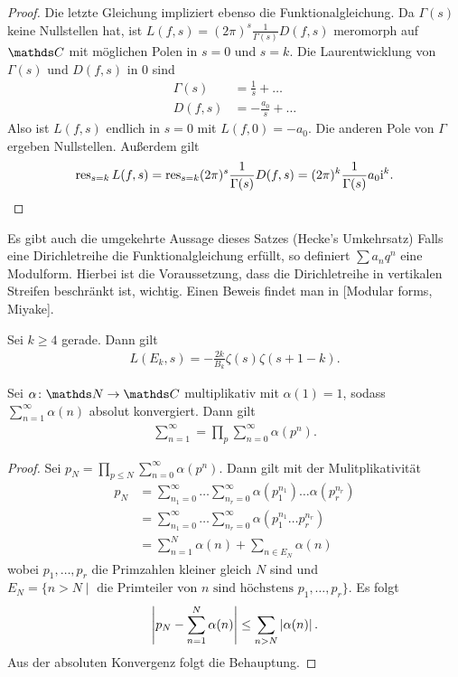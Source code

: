 \begin{proof}
Die letzte Gleichung impliziert ebenso die Funktionalgleichung.
Da $\Gamma(s)$ keine Nullstellen hat, ist $L(f,s)=(2\pi)^s \frac{1}{\Gamma(s)}D(f,s)$ meromorph auf $\C$ mit möglichen Polen in $s=0$ und $s=k$.
Die Laurentwicklung von $\Gamma(s)$ und $D(f,s)$ in $0$ sind
\begin{align*}
\Gamma(s)&=\frac{1}{s}+\dots\\
D(f,s)&=-\frac{a_0}{s}+\dots
\end{align*}
Also ist $L(f,s)$ endlich in $s=0$ mit $L(f,0)=-a_0$.
Die anderen Pole von $\Gamma$ ergeben Nullstellen.
Außerdem gilt
\begin{align*}
\operatorname{res}_{s=k}L(f,s)=\operatorname{res}_{s=k} (2\pi)^s \frac{1}{\Gamma(s)} D(f,s)=(2\pi)^k \frac{1}{\Gamma(s)}a_0\mathrm{i}^k. \qedhere
\end{align*}
\end{proof}
Es gibt auch die umgekehrte Aussage dieses Satzes (Hecke's Umkehrsatz)
Falls eine Dirichletreihe die Funktionalgleichung erfüllt, so definiert $\sum a_n q^n$ eine Modulform.
Hierbei ist die Voraussetzung, dass die Dirichletreihe in vertikalen Streifen beschränkt ist, wichtig.
Einen Beweis findet man in [Modular forms, Miyake].

\begin{bsp}
Sei $k\geq 4$ gerade. Dann gilt
\begin{align*}
L(E_k,s)=-\frac{2k}{B_k} \zeta(s)\zeta(s+1-k).
\end{align*}
\end{bsp}

\begin{prop}
Sei $\alpha \colon \N \to \C$ multiplikativ mit $\alpha(1)=1$, sodass
$\sum_{n=1}^\infty \alpha(n)$ absolut konvergiert.
Dann gilt
\begin{align*}
\sum_{n=1}^\infty=\prod_p \sum_{n=0}^\infty \alpha(p^n).
\end{align*}
\end{prop}
\begin{proof}
Sei $p_N=\prod_{p\leq N} \sum_{n=0}^\infty \alpha(p^n)$.
Dann gilt mit der Mulitplikativität
\begin{align*}
 p_N&=\sum_{n_1=0}^\infty \dots \sum_{n_r=0}^\infty \alpha(p_1^{n_1})\dots \alpha(p_r^{n_r})\\
 &=\sum_{n_1=0}^\infty \dots \sum_{n_r=0}^\infty \alpha(p_1^{n_1}\dots p_r^{n_r})\\
 &=\sum_{n=1}^N \alpha(n)+\sum_{n \in E_N} \alpha(n)
\end{align*}
wobei $p_1,\dots,p_r$ die Primzahlen kleiner gleich $N$ sind und
$E_N=\{n >N\mid \text{ die Primteiler von } n \text{ sind höchstens } p_1,\dots,p_r\}$.
Es folgt
\begin{align*}
\left\vert p_N -\sum_{n=1}^N \alpha(n)\right\vert\leq \sum_{n>N} \left\vert\alpha(n)\right\vert.
\end{align*}
Aus der absoluten Konvergenz folgt die Behauptung.
\end{proof}

